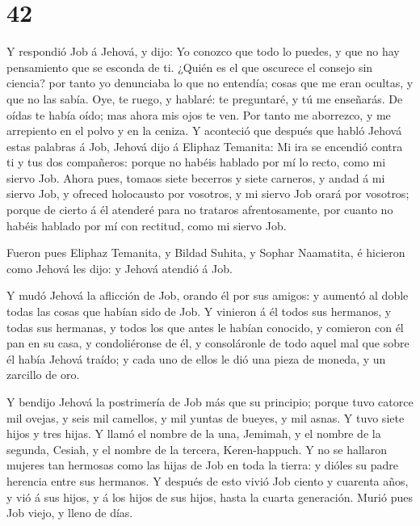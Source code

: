 \hypertarget{section-41}{%
\section{42}\label{section-41}}

 Y respondió Job á Jehová, y dijo:  Yo conozco
que todo lo puedes, y que no hay pensamiento que se esconda de ti.
 ¿Quién es el que oscurece el consejo sin ciencia? por tanto
yo denunciaba lo que no entendía; cosas que me eran ocultas, y que no
las sabía.  Oye, te ruego, y hablaré: te preguntaré, y tú me
enseñarás.  De oídas te había oído; mas ahora mis ojos te
ven.  Por tanto me aborrezco, y me arrepiento en el polvo y
en la ceniza.  Y aconteció que después que habló Jehová
estas palabras á Job, Jehová dijo á Eliphaz Temanita: Mi ira se encendió
contra ti y tus dos compañeros: porque no habéis hablado por mí lo
recto, como mi siervo Job.  Ahora pues, tomaos siete
becerros y siete carneros, y andad á mi siervo Job, y ofreced holocausto
por vosotros, y mi siervo Job orará por vosotros; porque de cierto á él
atenderé para no trataros afrentosamente, por cuanto no habéis hablado
por mí con rectitud, como mi siervo Job.

 Fueron pues Eliphaz Temanita, y Bildad Suhita, y Sophar
Naamatita, é hicieron como Jehová les dijo: y Jehová atendió á Job.

 Y mudó Jehová la aflicción de Job, orando él por sus
amigos: y aumentó al doble todas las cosas que habían sido de Job.
 Y vinieron á él todos sus hermanos, y todas sus hermanas,
y todos los que antes le habían conocido, y comieron con él pan en su
casa, y condoliéronse de él, y consoláronle de todo aquel mal que sobre
él había Jehová traído; y cada uno de ellos le dió una pieza de moneda,
y un zarcillo de oro.

 Y bendijo Jehová la postrimería de Job más que su
principio; porque tuvo catorce mil ovejas, y seis mil camellos, y mil
yuntas de bueyes, y mil asnas.  Y tuvo siete hijos y tres
hijas.  Y llamó el nombre de la una, Jemimah, y el nombre
de la segunda, Cesiah, y el nombre de la tercera, Keren-happuch.
 Y no se hallaron mujeres tan hermosas como las hijas de
Job en toda la tierra: y dióles su padre herencia entre sus hermanos.
 Y después de esto vivió Job ciento y cuarenta años, y vió
á sus hijos, y á los hijos de sus hijos, hasta la cuarta generación.
 Murió pues Job viejo, y lleno de días.
